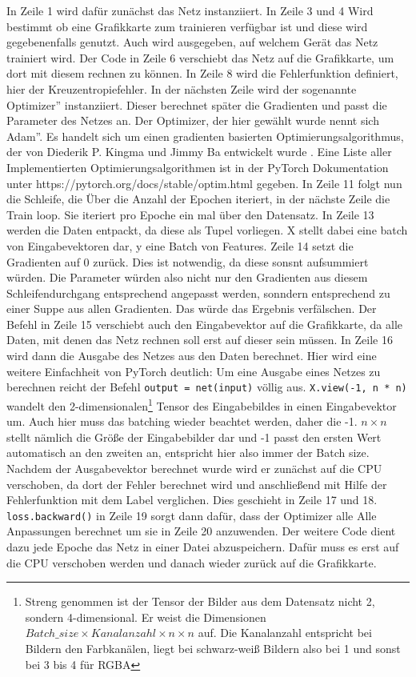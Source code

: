 \documentclass[11pt]{article}
\begin{document}
In Zeile 1 wird dafür zunächst das Netz instanziiert. In Zeile 3 und 4 Wird bestimmt ob eine Grafikkarte zum trainieren verfügbar ist und diese wird gegebenenfalls genutzt. Auch wird ausgegeben, auf welchem Gerät das Netz trainiert wird. Der Code in Zeile 6 verschiebt das Netz auf die Grafikkarte, um dort mit diesem rechnen zu können. In Zeile 8 wird die Fehlerfunktion definiert, hier der Kreuzentropiefehler. In der nächsten Zeile wird der sogenannte \glqq Optimizer'' instanziiert. Dieser berechnet später die Gradienten und passt die Parameter des Netzes an. Der Optimizer, der hier gewählt wurde nennt sich \glqq Adam''. Es handelt sich um einen gradienten basierten Optimierungsalgorithmus, der von Diederik P. Kingma und Jimmy Ba entwickelt wurde \cite{7}. Eine Liste aller Implementierten Optimierungsalgorithmen ist in der PyTorch Dokumentation unter https://pytorch.org/docs/stable/optim.html gegeben. In Zeile 11 folgt nun die Schleife, die Über die Anzahl der Epochen iteriert, in der nächste Zeile die Train loop. Sie iteriert pro Epoche ein mal über den Datensatz. In Zeile 13 werden die Daten entpackt, da diese als Tupel vorliegen. X stellt dabei eine batch von Eingabevektoren dar, y eine Batch von Features. Zeile 14 setzt die Gradienten auf 0 zurück. Dies ist notwendig, da diese sonsnt aufsummiert würden. Die Parameter würden also nicht nur den Gradienten aus diesem Schleifendurchgang entsprechend angepasst werden, sonndern entsprechend zu einer Suppe aus allen Gradienten. Das würde das Ergebnis verfälschen. Der Befehl in Zeile 15 verschiebt auch den Eingabevektor auf die Grafikkarte, da alle Daten, mit denen das Netz rechnen soll erst auf dieser sein müssen. In Zeile 16 wird dann die Ausgabe des Netzes aus den Daten berechnet. Hier wird eine weitere Einfachheit von PyTorch deutlich: Um eine Ausgabe eines Netzes zu berechnen reicht der Befehl \texttt{output = net(input)} völlig aus. \texttt{X.view(-1, n * n)} wandelt den 2-dimensionalen\footnote{Streng genommen ist der Tensor der Bilder aus dem Datensatz nicht 2, sondern 4-dimensional. Er weist die Dimensionen $Batch\_size\times Kanalanzahl\times n \times n$ auf. Die Kanalanzahl entspricht bei Bildern den Farbkanälen, liegt bei schwarz-weiß Bildern also bei 1 und sonst bei 3 bis 4 für RGBA} Tensor des Eingabebildes in einen Eingabevektor um. Auch hier muss das batching wieder beachtet werden, daher die -1. $n\times n$ stellt nämlich die Größe der Eingabebilder dar und -1 passt den ersten Wert automatisch an den zweiten an, entspricht hier also immer der Batch size. Nachdem der Ausgabevektor berechnet wurde wird er zunächst auf die CPU verschoben, da dort der Fehler berechnet wird und anschließend mit Hilfe der Fehlerfunktion mit dem Label verglichen. Dies geschieht in Zeile 17 und 18. \texttt{loss.backward()} in Zeile 19 sorgt dann dafür, dass der Optimizer alle Alle Anpassungen berechnet um sie in Zeile 20 anzuwenden. Der weitere Code dient dazu jede Epoche das Netz in einer Datei abzuspeichern. Dafür muss es erst auf die CPU verschoben werden und danach wieder zurück auf die Grafikkarte.
\end{document}
